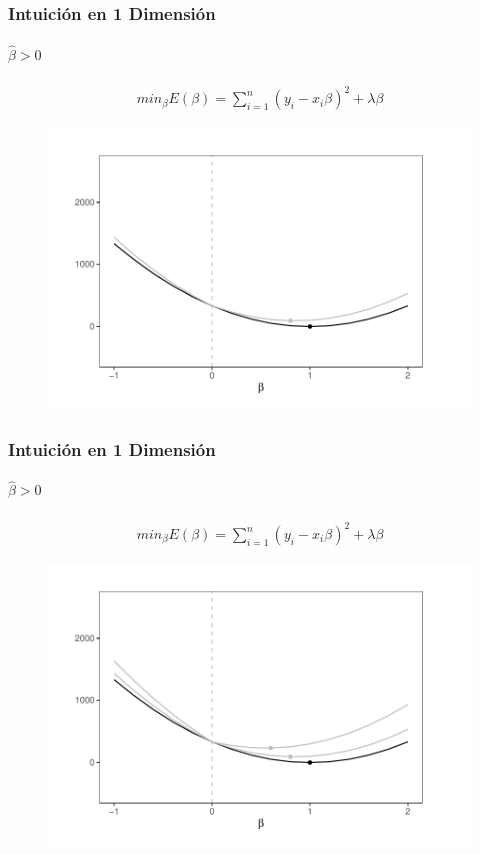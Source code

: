 \documentclass[
  shownotes,
  xcolor={svgnames},
  hyperref={colorlinks,citecolor=DarkBlue,linkcolor=andesred,urlcolor=DarkBlue}
  , aspectratio=169]{beamer}
\begin{document}
\begin{frame}[fragile]
\frametitle{Intuición en 1 Dimensión}
\framesubtitle{ $\hat{\beta}>0$}
\footnotesize
\begin{align}
 min_{\beta} E(\beta) = \sum_{i=1}^n (y_i-x_i \beta)^2 + \lambda \beta 
\end{align}
   \begin{figure}[H] \centering
            \captionsetup{justification=centering}
              \includegraphics[scale=0.6]{figures/lasso2.pdf}
 \end{figure}




\end{frame}
\begin{frame}[fragile]
\frametitle{Intuición en 1 Dimensión}
\framesubtitle{ $\hat{\beta}>0$}
\footnotesize
\begin{align}
 min_{\beta} E(\beta) = \sum_{i=1}^n (y_i-x_i \beta)^2 + \lambda \beta 
\end{align}

   \begin{figure}[H] \centering
            \captionsetup{justification=centering}
              \includegraphics[scale=0.6]{figures/lasso3.pdf}
 \end{figure}




\end{frame}
\end{document}
